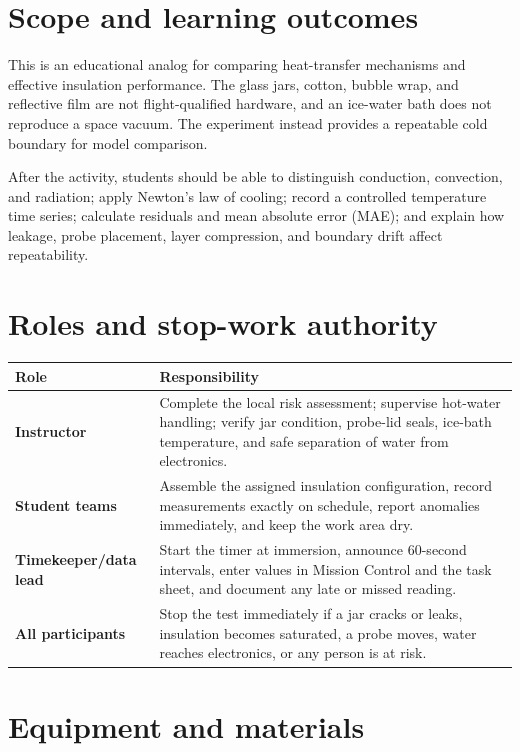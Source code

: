 \documentclass[11pt,a4paper]{article}
\begin{document}
\tableofcontents
\clearpage

\section{Scope and learning outcomes}

This is an educational analog for comparing heat-transfer mechanisms and effective insulation performance. The glass jars, cotton, bubble wrap, and reflective film are not flight-qualified hardware, and an ice-water bath does not reproduce a space vacuum. The experiment instead provides a repeatable cold boundary for model comparison.

After the activity, students should be able to distinguish conduction, convection, and radiation; apply Newton's law of cooling; record a controlled temperature time series; calculate residuals and mean absolute error (MAE); and explain how leakage, probe placement, layer compression, and boundary drift affect repeatability.

\section{Roles and stop-work authority}

\begin{tabularx}{\textwidth}{>{\bfseries}p{}Y}
\toprule
Role & Responsibility \\
\midrule
Instructor & Complete the local risk assessment; supervise hot-water handling; verify jar condition, probe-lid seals, ice-bath temperature, and safe separation of water from electronics. \\
Student teams & Assemble the assigned insulation configuration, record measurements exactly on schedule, report anomalies immediately, and keep the work area dry. \\
Timekeeper/data lead & Start the timer at immersion, announce 60-second intervals, enter values in Mission Control and the task sheet, and document any late or missed reading. \\
All participants & Stop the test immediately if a jar cracks or leaks, insulation becomes saturated, a probe moves, water reaches electronics, or any person is at risk. \\
\bottomrule
\end{tabularx}

\section{Equipment and materials}
\end{document}
